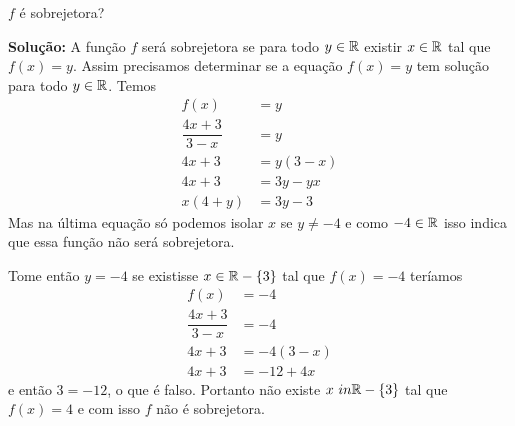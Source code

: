 \documentclass[12pt]{article}
\begin{document}
\vspace{.5cm}

\questao $f$ é sobrejetora?

\noindent\textbf{Solu\c{c}\~ao:} A função $f$ será sobrejetora se para todo $y \in \mathbb{R}$ existir $x \in \mathbb{R}$ tal que $f(x) = y$. Assim precisamos determinar se a equação $f(x) = y$ tem solução para todo $y \in \mathbb{R}$.
Temos
\begin{align*}
	f(x) &= y\\
	\dfrac{4x + 3}{3 - x} &= y\\
	4x + 3 &= y(3 - x)\\
	4x + 3 &= 3y - yx\\
	x(4 + y) &= 3y - 3
\end{align*}
Mas na última equação só podemos isolar $x$ se $y \ne -4$ e como $-4 \in \mathbb{R}$ isso indica que essa função não será sobrejetora.

Tome então $y = -4$ se existisse $x \in \mathbb{R} - \{3\}$ tal que $f(x) = -4$ teríamos
\begin{align*}
	f(x) &= -4\\
	\dfrac{4x + 3}{3 - x} &= -4\\
	4x + 3 &= -4(3 - x)\\
	4x + 3 &= -12 + 4x
\end{align*}
e então $3 = -12$, o que é falso. Portanto não existe $x \ in \mathbb{R} - \{3\}$ tal que $f(x) = 4$ e com isso $f$ não é sobrejetora.
\end{document}

